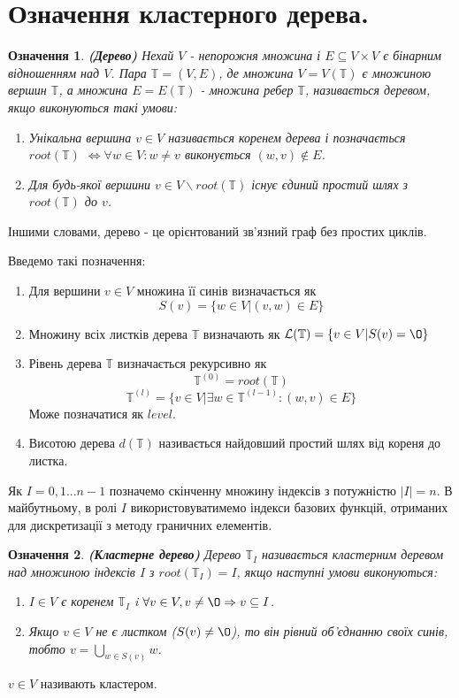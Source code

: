 \documentclass[12pt]{report}
\begin{document}
	\section{Означення кластерного дерева.}
	\newtheorem{Def}{Означення}[chapter]
	\begin{Def}
	{\bf (Дерево)} Нехай $V$ - непорожня множина і $E\subseteq V\times V$ є бінарним відношенням над $V$. Пара $\mathbb{T}=(V,E)$, де множина $V=V(\mathbb{T})$ є множиною вершин $\mathbb{T}$, а множина $E=E(\mathbb{T})$ - множина ребер $\mathbb{T}$, називається деревом, якщо виконуються такі умови:
	\begin{enumerate}
		\item[-] Унікальна вершина $v\in V$ називається коренем дерева і позначається $root(\mathbb{T})$ $\Leftrightarrow \forall w\in V:w\not=v$ виконується $(w,v)\not\in E$.
		\item[-] Для будь-якої вершини $v\in V\backslash root(\mathbb{T})$ існує єдиний простий шлях з $root(\mathbb{T})$ до $v$.
	\end{enumerate}

	\end{Def}
	Іншими словами, дерево - це орієнтований зв'язний граф без простих циклів.
	\par Введемо такі позначення:
	\begin{enumerate}
		\item[$\bullet$] Для вершини $v\in V$ множина її синів визначається як $$S(v)=\{w\in V |(v,w)\in E \}$$
		\item[$\bullet$] Множину всіх листків дерева $\mathbb{T}$ визначають як $\mathcal{L}(\mathbb{T})=\{v\in V|S(v)=\O \}$
		\item[$\bullet$] Рівень дерева $\mathbb{T}$ визначається рекурсивно як $$\mathbb{T}^{(0)}=root(\mathbb{T})$$
		$$\mathbb{T}^{(l)}=\{v \in V|\exists w\in \mathbb{T}^{(l-1)}:(w,v)\in E\}$$
		Може позначатися як $level$.
		\item[$\bullet$] Висотою дерева $d(\mathbb{T})$ називається найдовший простий шлях від кореня до листка.
	\end{enumerate}
	
	\hspace{0.8cm}Як $I={0,1...n-1}$ позначемо скінченну множину індексів з потужністю $|I|=n$. В майбутньому, в ролі $I$ використовуватимемо індекси базових функцій, отриманих для дискретизації з методу граничних елементів.
	\begin{Def}
	 {\bf (Кластерне дерево)} Дерево $\mathbb{T}_{I}$ називається кластерним деревом над множиною індексів $I$ з $root(\mathbb{T}_{I})=I$, якщо наступні умови виконуються:
	\begin{enumerate}
		\item[-] $I \in V$ є коренем $\mathbb{T}_{I}$ i $\forall v \in V,v\not=\O \Rightarrow v\subseteq I$.
		\item[-] Якщо $v\in V$ не є листком ($S(v)\not=\O$), то він рівний об'єднанню своїх синів, тобто $v=\bigcup_{w\in S(v)}w$.
	\end{enumerate}
	\end{Def}
	\par $v\in V$ називають кластером.
	
\end{document}
